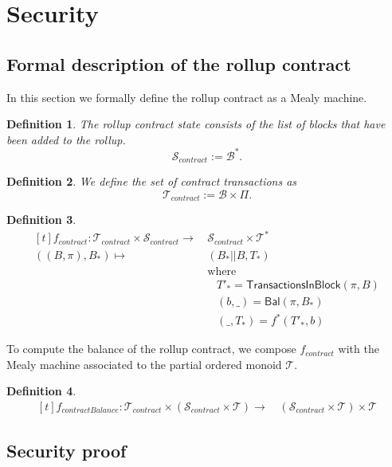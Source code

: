 \documentclass[runningheads]{llncs}
\newtheorem{defn}{Definition}
\newcommand{\T}{\mathcal{T}}
\renewcommand{\S}{\mathcal{S}}
\newcommand{\B}{\mathcal{B}}
\begin{document}
\newpage
\section{Security}\label{section:security}

\subsection{Formal description of the rollup contract}

In this section we formally define the rollup contract as a Mealy machine.

\begin{defn}
  The rollup contract state
  consists of the list of blocks that have been added to the rollup.
  \[\S_{contract} := \B^*.\]
\end{defn}

\begin{defn}
  We define the set of contract transactions as
  \[\T_{contract} := \B \times \Pi.\]
\end{defn}

\begin{defn}
  \[
    \begin{aligned}[t]
      f_{contract} \colon \T_{contract} \times \S_{contract} \to
      &\, \S_{contract} \times \T^*
      \\
      ((B,\pi), B_*)
      \mapsto &\, (B_* || B, T_*) \\
      &\, \text{where} \\
      & \quad T'_* = \mathsf{TransactionsInBlock}(\pi, B) \\
      & \quad (b,\_) = \mathsf{Bal}(\pi,B_*) \\
      & \quad (\_,T_*) = f^*(T'_*,b)
    \end{aligned}
  \]
\end{defn}

To compute the balance of the rollup contract, we compose
\(f_{contract}\) with the Mealy machine associated to the partial
ordered monoid \(\T\).

\begin{defn}
  \[
    \begin{aligned}[t]
      f_{contractBalance} \colon \T_{contract} \times (\S_{contract}
      \times \T) \to
      &\, (\S_{contract} \times \T) \times \T
    \end{aligned}
  \]
\end{defn}

\subsection{Security proof}
\end{document}
